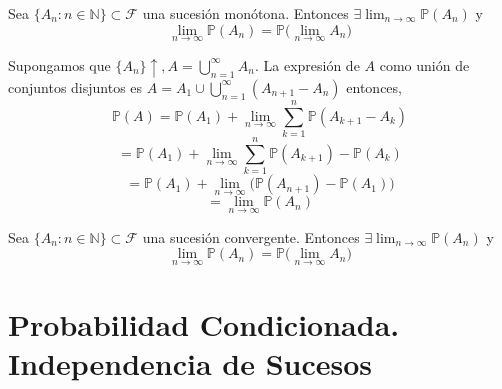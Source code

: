 \begin{ejr}

\end{ejr}

\begin{ejr}

\end{ejr}

\begin{theo}
Sea $\{A_n: n\in\mathbb{N}\}\subset\mathcal{F}$ una sucesión monótona. Entonces $\exists \lim_{n\rightarrow\infty} \mathbb{P}(A_n)$ y \[ \lim_{n\rightarrow\infty} \mathbb{P}(A_n) = \mathbb{P}\big(\lim_{n\rightarrow\infty} A_n \big)\]
\end{theo}

\begin{dem}
Supongamos que $\{A_n\} \uparrow, A = \bigcup_{n=1}^\infty A_n$. La expresión de $A$ como unión de conjuntos disjuntos es $A = A_1 \cup \bigcup_{n=1}^\infty (A_{n+1} - A_n)$ entonces, \[ \mathbb{P}(A) = \mathbb{P}(A_1) + \lim_{n\rightarrow\infty}\sum_{k=1}^n \mathbb{P}(A_{k+1} - A_k) \] \[ = \mathbb{P}(A_1) + \lim_{n\rightarrow\infty}\sum_{k=1}^n \mathbb{P}(A_{k+1}) - \mathbb{P}(A_k) \] \[ = \mathbb{P}(A_1) + \lim_{n\rightarrow\infty} \big( \mathbb{P}(A_{n+1}) - \mathbb{P}(A_1)  \big)\] \[ = \lim_{n\rightarrow\infty} \mathbb{P}(A_n)\]
\end{dem}

\begin{ejr}

\end{ejr}

\begin{ejr}

\end{ejr}

\begin{theo}
Sea $\{A_n: n\in\mathbb{N}\}\subset\mathcal{F}$ una sucesión convergente. Entonces $\exists \lim_{n\rightarrow\infty} \mathbb{P}(A_n)$ y \[ \lim_{n\rightarrow\infty} \mathbb{P}(A_n) = \mathbb{P}\big(\lim_{n\rightarrow\infty} A_n \big)\]
\end{theo}

\section{Probabilidad Condicionada. Independencia de Sucesos}

